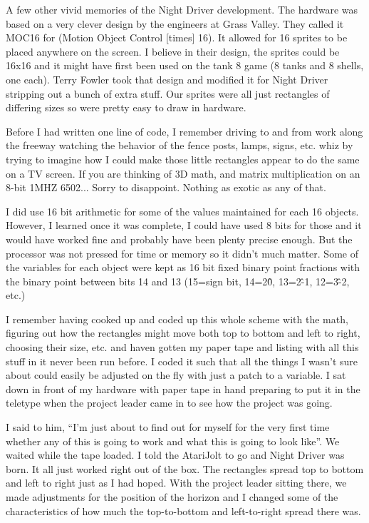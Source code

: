 A few other vivid memories of the Night Driver development. The hardware was based on a very clever design by the engineers at Grass Valley. They called it MOC16 for (Motion Object Control [times] 16). It allowed for 16 sprites to be placed anywhere on the screen. I believe in their design, the sprites could be 16x16 and it might have first been used on the tank 8 game (8 tanks and 8 shells, one each). Terry Fowler took that design and modified it for Night Driver stripping out a bunch of extra stuff. Our sprites were all just rectangles of differing sizes so were pretty easy to draw in hardware.

Before I had written one line of code, I remember driving to and from work along the freeway watching the behavior of the fence posts, lamps, signs, etc. whiz by trying to imagine how I could make those little rectangles appear to do the same on a TV screen. If you are thinking of 3D math, and matrix multiplication on an 8-bit 1MHZ 6502... Sorry to disappoint. Nothing as exotic as any of that. 

I did use 16 bit arithmetic for some of the values maintained for each 16 objects. However, I learned once it was complete, I could have used 8 bits for those and it would have worked fine and probably have been plenty precise enough. But the processor was not pressed for time or memory so it didn't much matter. Some of the variables for each object were kept as 16 bit fixed binary point fractions with the binary point between bits 14 and 13 (15=sign bit, 14=2\^0, 13=2\^-1, 12=3\^-2, etc.)

I remember having cooked up and coded up this whole scheme with the math, figuring out how the rectangles might move both top to bottom and left to right, choosing their size, etc. and haven gotten my paper tape and listing with all this stuff in it never been run before. I coded it such that all the things I wasn't sure about could easily be adjusted on the fly with just a patch to a variable. I sat down in front of my hardware with paper tape in hand preparing to put it in the teletype when the project leader came in to see how the project was going. 

I said to him, “I'm just about to find out for myself for the very first time whether any of this is going to work and what this is going to look like”. We waited while the tape loaded. I told the AtariJolt to go and Night Driver was born. It all just worked right out of the box. The rectangles spread top to bottom and left to right just as I had hoped. With the project leader sitting there, we made adjustments for the position of the horizon and I changed some of the characteristics of how much the top-to-bottom and left-to-right spread there was.

